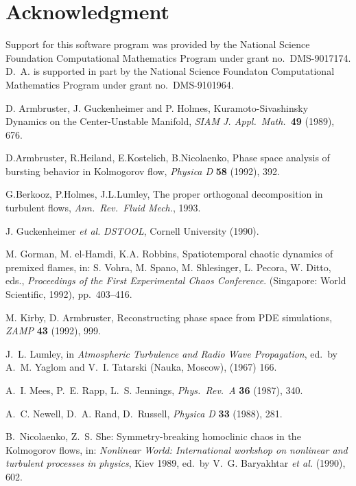 \section*{Acknowledgment}
Support for this software program was provided by the National Science
Foundation Computational Mathematics Program under grant no.\ DMS-9017174.
D.~A. is supported in part by the National Science Foundaton
Computational Mathematics Program under grant no.\ DMS-9101964.

\begin{thebibliography}{99}

 D. Armbruster, J. Guckenheimer and P. Holmes, 
 Kuramoto-Sivashinsky Dynamics on the Center-Unstable Manifold,
{\sl SIAM J. Appl.\ Math.}\ {\bf 49} (1989), 676.

 D.Armbruster, R.Heiland, E.Kostelich, B.Nicolaenko,
Phase space analysis of bursting behavior in Kolmogorov flow, 
{\sl Physica D} {\bf 58} (1992), 392.
 
 G.Berkooz, P.Holmes, J.L.Lumley, The proper orthogonal
decomposition in turbulent flows, {\sl Ann.\ Rev.\ Fluid Mech.}, 1993.

 J. Guckenheimer {\sl et al.} 
{\sl DSTOOL}, Cornell University (1990).

 M. Gorman, M. el-Hamdi, K.A. Robbins, Spatiotemporal chaotic
dynamics of premixed flames, in: S. Vohra, M. Spano,  M. Shlesinger, L.
Pecora, W. Ditto, eds., {\sl Proceedings of the First Experimental
Chaos Conference}. (Singapore:  World Scientific, 1992), pp.\ 403--416.

  M. Kirby, D. Armbruster, Reconstructing phase space from PDE
simulations, {\sl ZAMP} {\bf 43} (1992), 999.

  J.~L. Lumley, in {\sl Atmospheric Turbulence 
and Radio Wave Propagation},
ed.~by A.~M. Yaglom and V.~I. Tatarski (Nauka, Moscow),  (1967) 166.

 A.~I. Mees, P.~E. Rapp, L.~S. Jennings,
{\sl Phys.\ Rev.\ A} {\bf 36} (1987), 340.

 A.~C. Newell, D.~A. Rand, D.~Russell,
{\sl Physica D} {\bf 33} (1988), 281.

 B.~Nicolaenko, Z.~S. She:
Symmetry-breaking homoclinic chaos in the Kolmogorov flows, in:
{\sl Nonlinear World: International workshop on nonlinear and
turbulent processes in physics}, Kiev 1989, ed.~by V.~G. Baryakhtar
{\sl et al.} (1990), 602.


\end{thebibliography}
